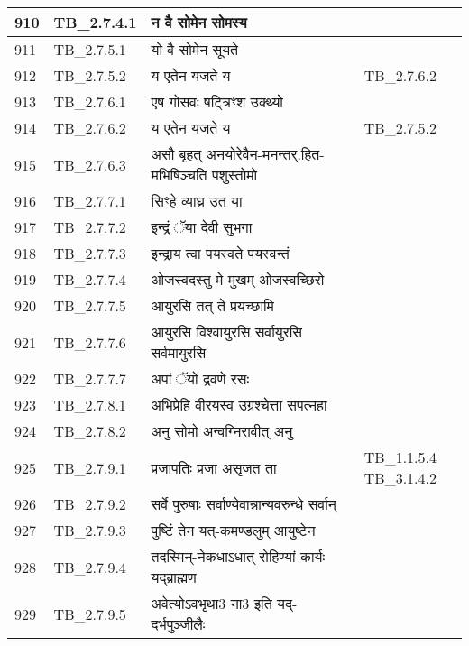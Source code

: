 \documentclass[17pt]{extarticle}
\begin{document}
\begin{longtable}{||p{0.4in}||p{0.9in}||p{4.0in}||p{0.9in}||}
        \hline
            910 & TB\_2.7.4.1 & न वै सोमेन सोमस्य &      \\
        \hline
            911 & TB\_2.7.5.1 & यो वै सोमेन सूयते &      \\
        \hline
            912 & TB\_2.7.5.2 & य एतेन यजते य &  TB\_2.7.6.2       \\
        \hline
            913 & TB\_2.7.6.1 & एष गोसवः षट्त्रिꣳश उक्थ्यो &      \\
        \hline
            914 & TB\_2.7.6.2 & य एतेन यजते य & TB\_2.7.5.2        \\
        \hline
            915 & TB\_2.7.6.3 & असौ बृहत् अनयोरेवैन{-}मनन्तर्.हित{-}मभिषिञ्चति पशुस्तोमो &      \\
        \hline
            916 & TB\_2.7.7.1 & सिꣳहे व्याघ्र उत या &      \\
        \hline
            917 & TB\_2.7.7.2 & इन्द्रं ॅया देवी सुभगा &      \\
        \hline
            918 & TB\_2.7.7.3 & इन्द्राय त्वा पयस्वते पयस्वन्तं &      \\
        \hline
            919 & TB\_2.7.7.4 & ओजस्वदस्तु मे मुखम् ओजस्वच्छिरो &      \\
        \hline
            920 & TB\_2.7.7.5 & आयुरसि तत् ते प्रयच्छामि &      \\
        \hline
            921 & TB\_2.7.7.6 & आयुरसि विश्वायुरसि सर्वायुरसि सर्वमायुरसि &      \\
        \hline
            922 & TB\_2.7.7.7 & अपां ॅयो द्रवणे रसः &      \\
        \hline
            923 & TB\_2.7.8.1 & अभिप्रेहि वीरयस्व उग्रश्चेत्ता सपत्नहा &      \\
        \hline
            924 & TB\_2.7.8.2 & अनु सोमो अन्वग्निरावीत् अनु &      \\
        \hline
            925 & TB\_2.7.9.1 & प्रजापतिः प्रजा असृजत ता & TB\_1.1.5.4  TB\_3.1.4.2       \\
        \hline
            926 & TB\_2.7.9.2 & सर्वे पुरुषाः सर्वाण्येवान्नान्यवरुन्धे सर्वान् &      \\
        \hline
            927 & TB\_2.7.9.3 & पुष्टिं तेन यत्{-}कमण्डलुम् आयुष्टेन &      \\
        \hline
            928 & TB\_2.7.9.4 & तदस्मिन्{-}नेकधाऽधात् रोहिण्यां कार्यः यद्ब्राह्मण &      \\
        \hline
            929 & TB\_2.7.9.5 & अवेत्योऽवभृथा3 ना3 इति यद्{-}दर्भपुञ्जीलैः &      \\

\end{longtable}
\end{document}

